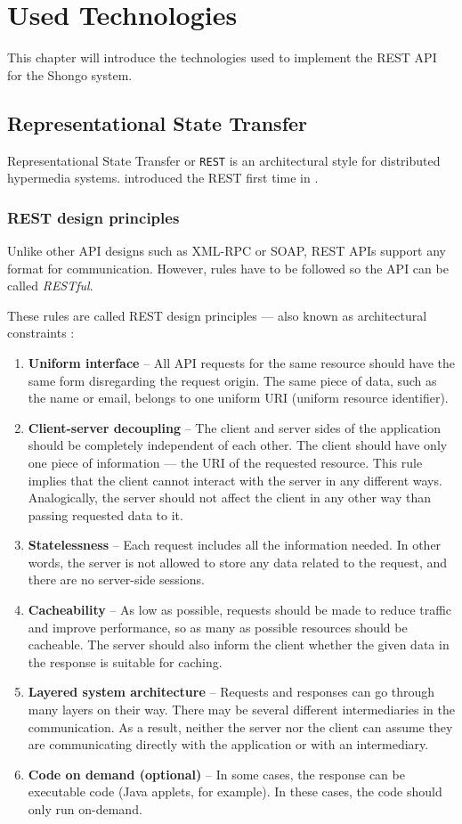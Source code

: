 \chapter{Used Technologies} \label{cha:technologies}
This chapter will introduce the technologies used to implement the REST API for the Shongo system.


\section{Representational State Transfer} \label{rest}
Representational State Transfer or \texttt{REST} is an architectural style for distributed hypermedia systems. \citeauthor{fielding2000rest} introduced the REST first time in \citeyear{fielding2000rest} \cite{fielding2000rest}.
\subsection{REST design principles}
Unlike other API designs such as XML-RPC or SOAP, REST APIs support any format for communication. However, rules have to be followed so the API can be called \emph{RESTful}.

These rules are called REST design principles --- also known as architectural constraints \cite{ibmrest}:
\begin{enumerate}
    \item \textbf{Uniform interface} -- All API requests for the same resource should have the same form disregarding the request origin. The same piece of data, such as the name or email, belongs to one uniform URI (uniform resource identifier).
    \item \textbf{Client-server decoupling} -- The client and server sides of the application should be completely independent of each other. The client should have only one piece of information — the URI of the requested resource. This rule implies that the client cannot interact with the server in any different ways. Analogically, the server should not affect the client in any other way than passing requested data to it.
    \item \textbf{Statelessness} -- Each request includes all the information needed. In other words, the server is not allowed to store any data related to the request, and there are no server-side sessions.
    \item \textbf{Cacheability} -- As low as possible, requests should be made to reduce traffic and improve performance, so as many as possible resources should be cacheable. The server should also inform the client whether the given data in the response is suitable for caching.
    \item \textbf{Layered system architecture} -- Requests and responses can go through many layers on their way. There may be several different intermediaries in the communication. As a result, neither the server nor the client can assume they are communicating directly with the application or with an intermediary.
    \item \textbf{Code on demand (optional)} -- In some cases, the response can be executable code (Java applets, for example). In these cases, the code should only run on-demand.
\end{enumerate}


